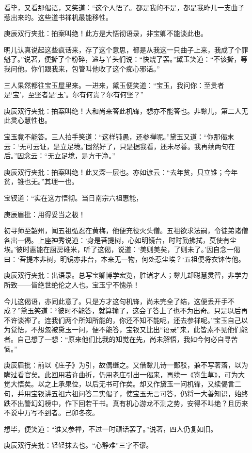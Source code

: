 \begin{parag}
    看毕，又看那偈语，又笑道：“这个人悟了。都是我的不是，都是我昨儿一支曲子惹出来的。这些道书禅机最能移性。\begin{note}庚辰双行夹批：拍案叫绝！此方是大悟彻语录，非宝卿不能谈此也。\end{note}明儿认真说起这些疯话来，存了这个意思，都是从我这一只曲子上来，我成了个罪魁了。”说著，便撕了个粉碎，递与丫头们说：“快烧了罢。”黛玉笑道：“不该撕，等我问他。你们跟我来，包管叫他收了这个痴心邪话。”
\end{parag}


\begin{parag}
    三人果然都往宝玉屋里来。一进来，黛玉便笑道：“宝玉，我问你：至贵者是‘宝’，至坚者是‘玉’。尔有何贵？尔有何坚？”\begin{note}庚辰双行夹批：拍案叫绝！大和尚来答此机锋，想亦不能答也。非颦儿，第二人无此灵心慧性也。\end{note}宝玉竟不能答。三人拍手笑道：“这样钝愚，还参禅呢。”黛玉又道：“你那偈末云：‘无可云证，是立足境。’固然好了，只是据我看，还未尽善。我再续两句在后。”因念云：“无立足境，是方干净。”\begin{note}庚辰双行夹批：拍案叫绝！此又深一层也。亦如谚云：“去年贫，只立锥；今年贫，锥也无。”其理一也。\end{note}宝钗道：“实在这方悟彻。当日南宗六祖惠能，\begin{note}庚辰眉批：用得妥当之极！\end{note}初寻师至韶州，闻五祖弘忍在黄梅，他便充役火头僧。五祖欲求法嗣，令徒弟诸僧各出一偈。上座神秀说道：‘身是菩提树，心如明镜台，时时勤拂拭，莫使有尘埃。’彼时惠能在厨房碓米，听了这偈，说道：‘美则美矣，了则未了。’因自念一偈曰：‘菩提本非树，明镜亦非台，本来无一物，何处惹尘埃？‘五祖便将衣钵传他。\begin{note}庚辰双行夹批：出语录。总写宝卿博学宏览，胜诸才人；颦儿却聪慧灵智，非学力所致——皆绝世绝伦之人也。宝玉宁不愧杀！\end{note}今儿这偈语，亦同此意了。只是方才这句机锋，尚未完全了结，这便丢开手不成？”黛玉笑道：“彼时不能答，就算输了，这会子答上了也不为出奇。只是以后再不许谈禅了。连我们两个所知所能的，你还不知不能呢，还去参禅呢。”宝玉自己以为觉悟，不想忽被黛玉一问，便不能答，宝钗又比出“语录”来，此皆素不见他们能者。自己想了一想：“原来他们比我的知觉在先，尚未解悟，我如今何必自寻苦恼。”\begin{note}庚辰眉批：前以《庄子》为引，故偶继之。又借颦儿诗一鄙驳，兼不写著落，以为瞒过看官矣。此回用若许曲折，仍用老庄引出一偈来，再续一《寄生草》，可为大觉大悟矣。以之上承果位，以后无书可作矣。却又作黛玉一问机锋，又续偈言二句，并用宝钗讲五祖六祖问答二实偈子，使宝玉无言可答，仍将一大善知识，始终跌不出警幻幻榜中，作下回若干书。真有机心游龙不测之势，安得不叫绝？且历来不说中万写不到者。己卯冬夜。\end{note}想毕，便笑道：“谁又参禅，不过一时顽话罢了。”说著，四人仍复如旧。\begin{note}庚辰双行夹批：轻轻抹去也。“心静难”三字不谬。\end{note}
\end{parag}


